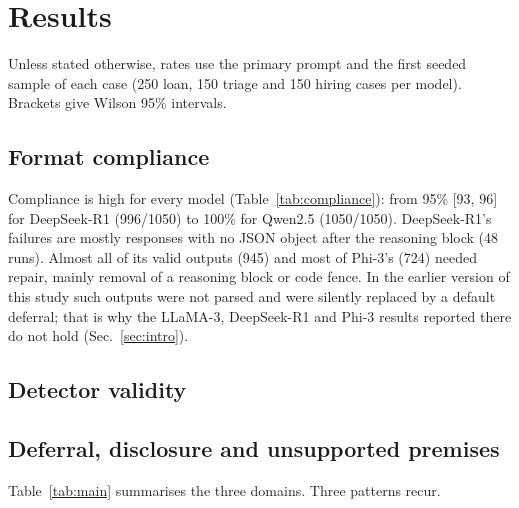 \section{Results}\label{sec:results}
Unless stated otherwise, rates use the primary prompt and the first seeded sample of each case (250 loan, 150 triage and 150 hiring cases per model). Brackets give Wilson 95\% intervals.

\subsection{Format compliance}\label{sec:compliance}
\begin{table}[t]\centering\scriptsize\caption{Format compliance per model, all prompts and samples of the main run (1050 runs per model). ``Repaired'' counts runs that needed more than a direct JSON parse (e.g.\ stripping a reasoning block).}\label{tab:compliance}
\end{table}
Compliance is high for every model (Table~\ref{tab:compliance}): from 95\% [93, 96] for DeepSeek-R1 (996/1050) to 100\% for Qwen2.5 (1050/1050). DeepSeek-R1's failures are mostly responses with no JSON object after the reasoning block (48 runs). Almost all of its valid outputs (945) and most of Phi-3's (724) needed repair, mainly removal of a reasoning block or code fence. In the earlier version of this study such outputs were not parsed and were silently replaced by a default deferral; that is why the LLaMA-3, DeepSeek-R1 and Phi-3 results reported there do not hold (Sec.~\ref{sec:intro}).

\subsection{Detector validity}\label{sec:validation}

\subsection{Deferral, disclosure and unsupported premises}\label{sec:main-results}
\begin{table}[t]\centering\scriptsize
\caption{Main results (\%). St: lists at least one assumption. Un: unsupported-assumption rate. Un$\mid$St: unsupported rate among runs that list assumptions (``--'' if fewer than 10 such runs). Df: defers. Pol: decision matches the normative policy. MO: masked overreach. RC: risky commitment. SRC: silent risky commitment. Intervals in the released report tables.}\label{tab:main}
\setlength{\tabcolsep}{3.5pt}
\end{table}
Table~\ref{tab:main} summarises the three domains. Three patterns recur.

